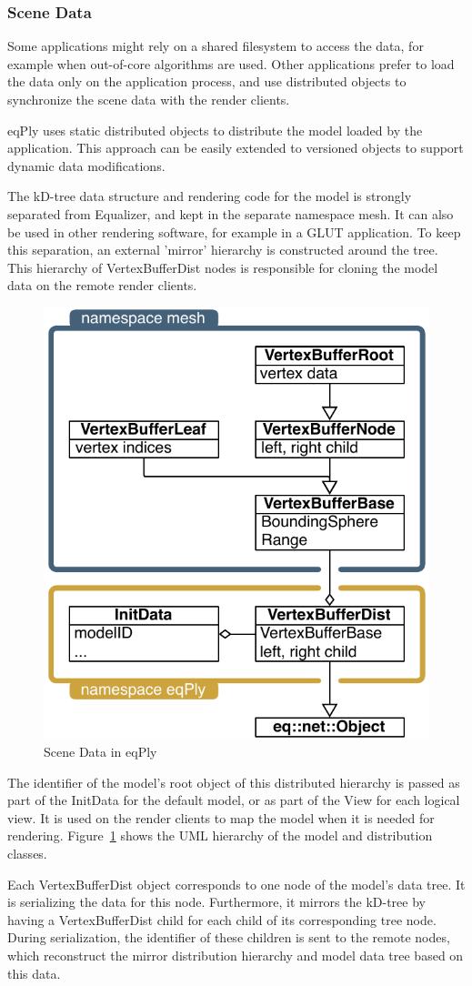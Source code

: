 \documentclass[10pt,a4]{scrartcl}
\newcommand{\fig}[1]{Figure~\ref{#1}}
\begin{document}
\subsubsection{\label{sSceneData}Scene Data}

Some applications might rely on a shared filesystem to access the data,
for example when out-of-core algorithms are used. Other applications
prefer to load the data only on the application process, and use
distributed objects to synchronize the scene data with the render
clients.

\textsf{eqPly} uses static distributed objects to distribute the model
loaded by the application. This approach can be easily extended to
versioned objects to support dynamic data modifications.

The kD-tree data structure and rendering code for the model is strongly
separated from Equalizer, and kept in the separate namespace
\textsf{mesh}. It can also be used in other rendering software, for
example in a GLUT application. To keep this separation, an external
'mirror' hierarchy is constructed around the tree. This hierarchy of
\textsf{VertexBufferDist} nodes is responsible for cloning the model
data on the remote render clients.

\begin{figure}
  \includegraphics[width=.382\textwidth]{images/modelDist.pdf}
  {\caption{\label{fModelDist}Scene Data in eqPly}}
\end{figure}
The identifier of the model's root object of this distributed hierarchy
is passed as part of the \textsf{InitData} for the default model, or as
part of the \textsf{View} for each logical view. It is used on the
render clients to map the model when it is needed for
rendering. \fig{fModelDist} shows the UML hierarchy of the model and
distribution classes.

Each \textsf{VertexBufferDist} object corresponds to one node of the
model's data tree. It is serializing the data for this
node. Furthermore, it mirrors the kD-tree by having a
\textsf{VertexBufferDist} child for each child of its corresponding tree
node. During serialization, the identifier of these children is sent to
the remote nodes, which reconstruct the mirror distribution hierarchy
and model data tree based on this data.
\end{document}
